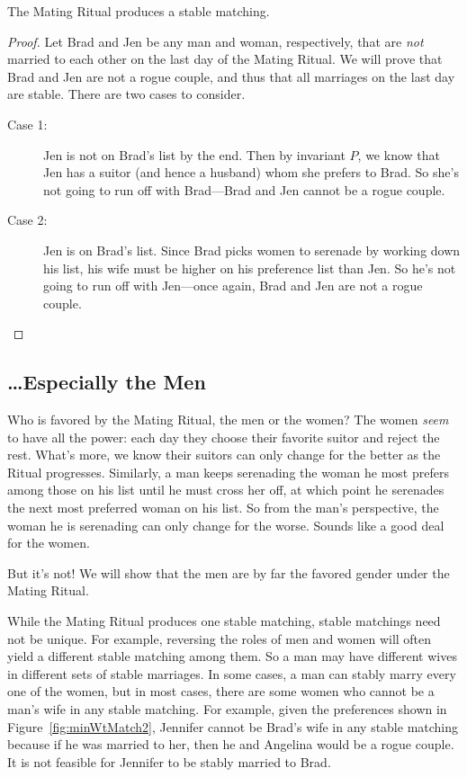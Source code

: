 \begin{theorem}
The Mating Ritual produces a stable matching.
\end{theorem}

\begin{proof}
Let Brad and Jen be any man and woman, respectively, that are
\emph{not} married to each other on the last day of the Mating Ritual.
We will prove that Brad and Jen are not a rogue couple, and thus that
all marriages on the last day are stable.  There are two cases to consider.
\begin{description}

\item[Case 1:] Jen is not on Brad's list by the end.  Then by
  invariant $P$, we know that Jen has a suitor (and hence a husband)
  whom she prefers to Brad.  So she's not going to run off with
  Brad---Brad and Jen cannot be a rogue couple.

\item[Case 2:] Jen is on Brad's list.  Since Brad picks women to
  serenade by working down his list, his wife must be higher on his
  preference list than Jen.  So he's not going to run off with
  Jen---once again, Brad and Jen are not a rogue couple.  \qedhere

\end{description}

\end{proof}


\subsection{\dots Especially the Men}

Who is favored by the Mating Ritual, the men or the women?  The women
\emph{seem} to have all the power: each day they choose their favorite
suitor and reject the rest.  What's more, we know their suitors can
only change for the better as the Ritual progresses.  Similarly, a man
keeps serenading the woman he most prefers among those on his list
until he must cross her off, at which point he serenades the next most
preferred woman on his list.  So from the man's perspective, the woman
he is serenading can only change for the worse.  Sounds like a good
deal for the women.

But it's not!  We will show that the men are by far the favored gender
under the Mating Ritual.

While the Mating Ritual produces one stable matching, stable matchings
need not be unique.  For example, reversing the roles of men and women
will often yield a different stable matching among them.  So a man may
have different wives in different sets of stable marriages.
In some cases, a man can stably marry every one of the women, but in
most cases, there are some women who cannot be a man's wife in any
stable matching.  For example, given the preferences shown in
Figure~\ref{fig:minWtMatch2}, Jennifer cannot be Brad's wife in any
stable matching because if he was married to her, then he and Angelina
would be a rogue couple.  It is not feasible for Jennifer to be stably
married to Brad.

